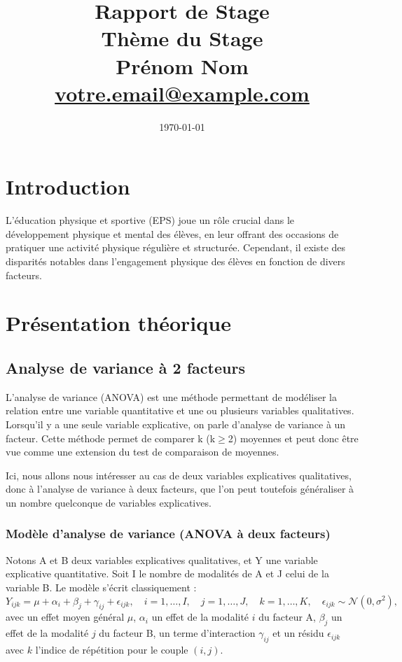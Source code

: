 \documentclass[12pt,a4paper]{article}
\title{
	\textbf{Rapport de Stage}\\[0.5cm]
	\textbf{Thème du Stage}\\
	\vspace{2cm}
	\textbf{Prénom Nom}\\
	\vspace{1cm}
	\href{mailto:votre.email@example.com}{votre.email@example.com}
}
\author{}
\date{\today}
\begin{document}
	
	\maketitle
	
	\newpage
	\tableofcontents
	\newpage
	
	\section{Introduction}
	L'éducation physique et sportive (EPS) joue un rôle crucial dans le développement physique et mental des élèves, en leur offrant des occasions de pratiquer une activité physique régulière et structurée. Cependant, il existe des disparités notables dans l'engagement physique des élèves en fonction de divers facteurs.
	
	\section{Présentation théorique}
	\subsection{Analyse de variance à 2 facteurs}
	L'analyse de variance (ANOVA) est une méthode permettant de modéliser la relation entre une variable quantitative et une ou plusieurs variables qualitatives. Lorsqu'il y a une seule variable explicative, on parle d'analyse de variance à un facteur. Cette méthode permet de comparer k (k$\geq$2) moyennes et peut donc être vue comme une extension du test de comparaison de moyennes.
	
	Ici, nous allons nous intéresser au cas de deux variables explicatives qualitatives, donc à l'analyse de variance à deux facteurs, que l'on peut toutefois généraliser à un nombre quelconque de variables explicatives.
	
	\subsubsection{Modèle d'analyse de variance (ANOVA à deux facteurs)}
	Notons A et B deux variables explicatives qualitatives, et Y une variable explicative quantitative. Soit I le nombre de modalités de A et J celui de la variable B.
	Le modèle s'écrit classiquement :
	\begin{equation}
		Y_{ijk} = \mu + \alpha_i + \beta_j + \gamma_{ij} + \epsilon_{ijk}, \quad i = 1, \ldots, I, \quad j = 1, \ldots, J, \quad k = 1, \ldots, K, \quad \epsilon_{ijk} \sim \mathcal{N}(0,\sigma^2),
	\end{equation}
	avec un effet moyen général $\mu$, $\alpha_i$ un effet de la modalité $i$ du facteur A, $\beta_j$ un effet de la modalité $j$ du facteur B, un terme d'interaction $\gamma_{ij}$ et un résidu $\epsilon_{ijk}$ avec $k$ l'indice de répétition pour le couple $(i,j)$.
	
\end{document}
